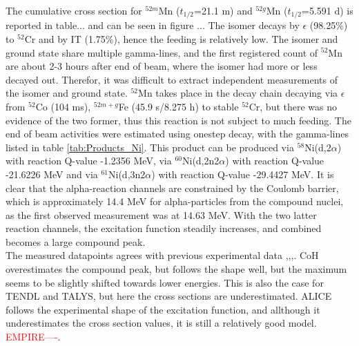 \subsubsection{}
The cumulative cross section for $^{52m}$Mn ($t_{1/2}$=21.1 m) and $^{52g}$Mn ($t_{1/2}$=5.591 d) \cite{Dong2015} is reported in table... and can be seen in figure ... The isomer decays by $\epsilon$ (98.25\%) to $^{52}$Cr and by IT (1.75\%), hence the feeding is relatively low. The isomer and ground state share multiple gamma-lines, and the first registered count of $^{52}$Mn are about 2-3 hours after end of beam, where the isomer had more or less decayed out. Therefor, it was difficult to extract independent measurements of the isomer and ground state. $^{52}$Mn takes place in the decay chain decaying via $\epsilon$ from $^{52}$Co (104 ms), $^{52m+g}$Fe (45.9 s/8.275 h) to stable $^{52}$Cr, but there was no evidence of the two former, thus this reaction is not subject to much feeding. The end of beam activities were estimated using onestep decay, with the gamma-lines listed in table \ref{tab:Products_Ni}. This product can be produced via  $^{58}$Ni(d,2$\alpha$) with reaction Q-value -1.2356 MeV, via $^{60}$Ni(d,2n2$\alpha$) with reaction Q-value -21.6226  MeV and via $^{61}$Ni(d,3n2$\alpha$) with reaction Q-value -29.4427 MeV. It is clear that the alpha-reaction channels are constrained by the Coulomb barrier, which is approximately 14.4 MeV for alpha-particles from the compound nuclei, as the first observed measurement was at 14.63 MeV. With the two latter reaction channels, the excitation function steadily increases, and combined becomes a large compound peak. \\
\noindent 
The measured datapoints agrees with previous experimental data \cite{Hermanne2013},\cite{Takacs2007},\cite{Usman2016},\cite{Amjed2013}. CoH overestimates the compound peak, but follows the shape well, but the maximum seems to be slightly shifted towards lower energies. This is also the case for TENDL and TALYS, but here the cross sections are underestimated. ALICE follows the experimental shape of the excitation function, and allthough it underestimates the cross section values, it is still a relatively good model. \textcolor{red}{EMPIRE----}. 

